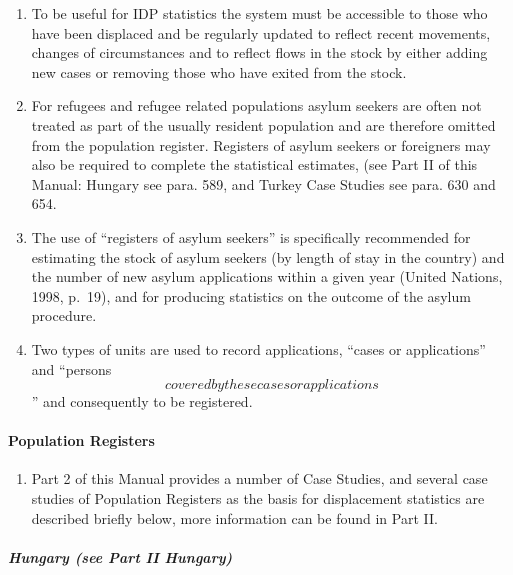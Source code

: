 \documentclass[
]{article}
\providecommand{\tightlist}{%
  \setlength{\itemsep}{0pt}\setlength{\parskip}{0pt}}
\begin{document}
\begin{enumerate}
\def\labelenumi{\arabic{enumi}.}
\setcounter{enumi}{153}
\item
  To be useful for IDP statistics the system must be accessible to
  those who have been displaced and be regularly updated to reflect
  recent movements, changes of circumstances and to reflect flows in
  the stock by either adding new cases or removing those who have
  exited from the stock.
\item
  For refugees and refugee related populations asylum seekers are
  often not treated as part of the usually resident population and are
  therefore omitted from the population register. Registers of asylum
  seekers or foreigners may also be required to complete the
  statistical estimates, (see Part II of this Manual: Hungary see
  para. 589, and Turkey Case Studies see para. 630 and 654.
\item
  The use of ``registers of asylum seekers'' is specifically
  recommended for estimating the stock of asylum seekers (by length of
  stay in the country) and the number of new asylum applications
  within a given year (United Nations, 1998, p.~19), and for producing
  statistics on the outcome of the asylum procedure.
\item
  Two types of units are used to record applications, ``cases or
  applications'' and ``persons \[covered by these cases or
      applications\]'' and consequently to be registered.
\end{enumerate}

\hypertarget{c.1.-population-registers}{%
\paragraph{Population Registers}\label{c.1.-population-registers}}

\begin{enumerate}
\def\labelenumi{\arabic{enumi}.}
\setcounter{enumi}{157}
\tightlist
\item
  Part 2 of this Manual provides a number of Case Studies, and
  several case studies of Population Registers as the basis for
  displacement statistics are described briefly below, more
  information can be found in Part II.
\end{enumerate}

\hypertarget{hungary-see-part-ii-hungary}{%
\subparagraph{Hungary (see Part II Hungary)}\label{hungary-see-part-ii-hungary}}
\end{document}
